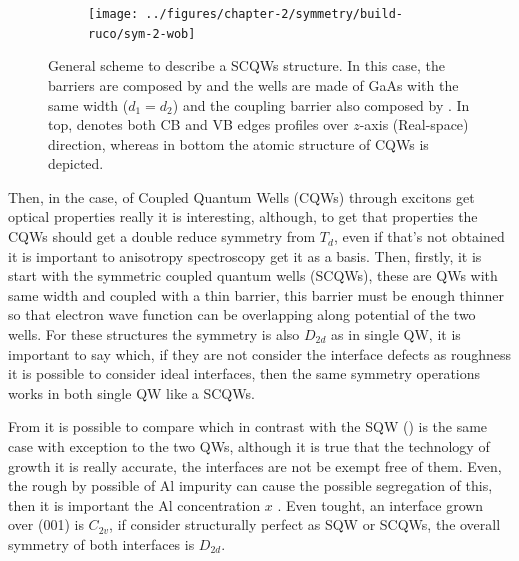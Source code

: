 \begin{figure}[h!]
	\centering
	\begin{subfigure}{\textwidth}
		\texttt{[image: ../figures/chapter-2/symmetry/build-ruco/sym-2-wob]}
		\label{subfig:subsubsec:chapter-2-scoupled-quantum-wells-a}
		\label{subfig:subsubsec:chapter-2-scoupled-quantum-wells-b}
	\end{subfigure}
	\caption
	{
General scheme to describe a SCQWs structure. In this case, the barriers are composed by \algaas and the wells are made of GaAs with the same width ($d_{1}=d_{2}$) and the coupling barrier also composed by \algaas. In top,  denotes both CB and VB edges profiles over $z$-axis (Real-space) direction, whereas in bottom  the atomic structure of \gls{CQWs} is depicted.
	}\label{fig:subsubsec:chapter-2-scoupled-quantum-wells}
\end{figure}

Then, in the case, of Coupled Quantum Wells (\gls{CQWs}) through excitons get optical properties really it is interesting, although, to get that properties the \gls{CQWs} should get a double reduce symmetry from $T_{d}$, even if that's not obtained it is important to anisotropy spectroscopy get it as a basis. 
Then, firstly, it is start with the symmetric coupled quantum wells (\gls{SCQWs}), these are \gls{QW}s with same width and coupled with a thin barrier, this barrier must be enough thinner so that electron wave function can be overlapping along potential of the two wells. 
For these structures the symmetry is also $D_{2d}$ as in single \gls{QW}, it is important to say which, if they are not  consider the  interface defects as roughness it is possible to consider  ideal interfaces, then the same symmetry operations works in both single \gls{QW} like a \gls{SCQWs}. 

From  it is possible to compare which in contrast with the SQW () is the same case with exception to the two \gls{QW}s, although it is true that the technology of growth it is really accurate, the interfaces are not be exempt  free of them. Even, the rough by possible of Al impurity can cause the possible segregation of this, then it is important the Al concentration $x$ \cite{chand1990origin,tillmann2002direct}. Even tought, an interface grown over (001) is $C_{2v}$, if consider structurally perfect as \gls{SQW} or \gls{SCQWs}, the overall symmetry of both interfaces is $D_{2d}$\cite{magri2000anticrossing}.

